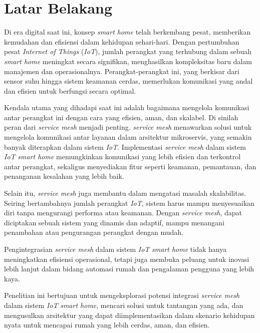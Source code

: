 \section{Latar Belakang}

Di era digital saat ini, konsep \textit{smart home} telah berkembang pesat, memberikan kemudahan dan efisiensi dalam kehidupan sehari-hari. Dengan pertumbuhan pesat \textit{Internet of Things} (\textit{IoT}), jumlah perangkat yang terhubung dalam sebuah \textit{smart home} meningkat secara signifikan, menghasilkan kompleksitas baru dalam manajemen dan operasionalnya. Perangkat-perangkat ini, yang berkisar dari sensor suhu hingga sistem keamanan cerdas, memerlukan komunikasi yang andal dan efisien untuk berfungsi secara optimal.

Kendala utama yang dihadapi saat ini adalah bagaimana mengelola komunikasi antar perangkat ini dengan cara yang efisien, aman, dan skalabel. Di sinilah peran dari \textit{service mesh} menjadi penting. \textit{service mesh} menawarkan solusi untuk mengelola komunikasi antar layanan dalam arsitektur mikroservis, yang semakin banyak diterapkan dalam sistem \textit{IoT}. Implementasi \textit{service mesh} dalam sistem \textit{IoT} \textit{smart home} memungkinkan komunikasi yang lebih efisien dan terkontrol antar perangkat, sekaligus menyediakan fitur seperti keamanan, pemantauan, dan penanganan kesalahan yang lebih baik.

Selain itu, \textit{service mesh} juga membantu dalam mengatasi masalah skalabilitas. Seiring bertambahnya jumlah perangkat \textit{IoT}, sistem harus mampu menyesuaikan diri tanpa mengurangi performa atau keamanan. Dengan \textit{service mesh}, dapat diciptakan sebuah sistem yang dinamis dan adaptif, mampu menangani penambahan atau pengurangan perangkat dengan mudah.

Pengintegrasian \textit{service mesh} dalam sistem \textit{IoT} \textit{smart home} tidak hanya meningkatkan efisiensi operasional, tetapi juga membuka peluang untuk inovasi lebih lanjut dalam bidang automasi rumah dan pengalaman pengguna yang lebih kaya.

Penelitian ini bertujuan untuk mengeksplorasi potensi integrasi \textit{service mesh} dalam sistem \textit{IoT} \textit{smart home}, mencari solusi untuk tantangan yang ada, dan mengusulkan arsitektur yang dapat diimplementasikan dalam skenario kehidupan nyata untuk mencapai rumah yang lebih cerdas, aman, dan efisien.